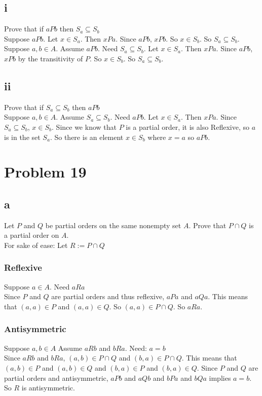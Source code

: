\documentclass{article}
\begin{document}
\subsection*{i}
Prove that if $aPb$ then $S_a \subseteq S_b$\\
Suppose $aPb$. Let $x \in S_a$. Then $xPa$. Since $aPb$, $xPb$. So $x \in S_b$. So $S_a \subseteq S_b$.\\ 

Suppose $a,b \in A$. Assume $aPb$. Need $S_a \subseteq S_b$. Let $x \in S_a$. Then $xPa$. Since $aPb$, $xPb$ by the transitivity of $P$. So $x \in S_b$. So $S_a \subseteq S_b$.\\

\subsection*{ii}
Prove that if $S_a \subseteq S_b$ then $aPb$\\
Suppose $a,b \in A$. Assume $S_a \subseteq S_b$. Need $aPb$. Let $x \in S_a$. Then $xPa$. Since $S_a \subseteq S_b$, $x \in S_b$. Since we know that $P$ is a partial order, it is also Reflexive, so $a$ is in the set $S_a$. So there is an element $x \in S_b$ where $x=a$ so $aPb$.\\

\section*{Problem 19}

\subsection*{a}
Let $P$ and $Q$ be partial orders on the same nonempty set $A$. Prove that $P \cap Q$ is a partial order on $A$.\\
For sake of ease: Let $R := P \cap Q$\\


\subsubsection*{Reflexive}
Suppose $a \in A$. 
Need $aRa$\\
Since $P$ and $Q$ are partial orders and thus reflexive, $aPa$ and $aQa$. This means that $(a,a) \in P$ and $(a,a) \in Q$. So $(a,a) \in P \cap Q$. So $aRa$.

\subsubsection*{Antisymmetric}
Suppose $a,b \in A$
Assume $aRb$ and $bRa$.
Need: $a = b$\\
Since $aRb$ and $bRa$, $(a,b) \in P \cap Q$ and $(b,a) \in P \cap Q$. This means that $(a,b) \in P$ and $(a,b) \in Q$ and $(b,a) \in P$ and $(b,a) \in Q$. Since $P$ and $Q$ are partial orders and antisymmetric, $aPb$ and $aQb$ and $bPa$ and $bQa$ implies $a = b$. So $R$ is antisymmetric.
\end{document}
